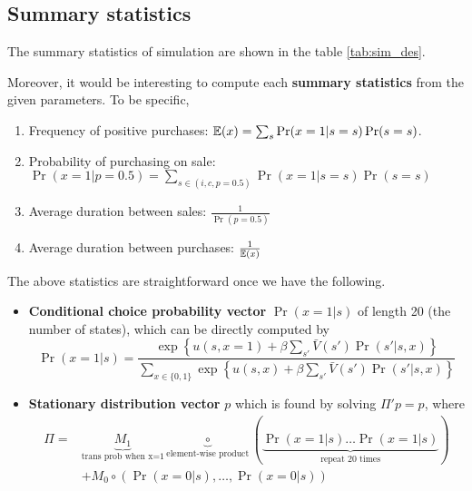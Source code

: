 \documentclass[12pt]{article}[margin=1in]
\begin{document}
\subsection{Summary statistics}
The summary statistics of simulation are shown in the table \ref{tab:sim_des}.
\begin{table}[h]
    \centering
    \begin{minipage}{0.45\textwidth}
        \fontsize{8pt}{10pt}\selectfont
        \centering
        
        \label{tab:sim_des}
    \end{minipage}%
    \hspace{0.05\textwidth} %
    \begin{minipage}{0.45\textwidth}\fontsize{8pt}{10pt}\selectfont
        \centering
        
        \label{tab:theo_des}
    \end{minipage}
\end{table}
Moreover, it would be interesting to compute each \textbf{summary statistics}
from the given parameters. To be specific,
\begin{enumerate}
    \item Frequency of positive purchases: $\mathbb{E}(x)=\sum_s\Pr(x=1|s=s)\Pr(s=s)$.
    \item Probability of purchasing on sale: $\Pr(x=1|p=0.5)=\sum_{s\in (i,c,p=0.5)}
              \Pr(x=1|s=s)\Pr(s=s)$
    \item Average duration between sales: $\frac{1}{\Pr(p=0.5)}$
    \item Average duration between purchases: $\frac{1}{\mathbb{E}(x)}$
\end{enumerate}
The above statistics are straightforward once we have the following.
\begin{itemize}
    \item \textbf{Conditional choice probability vector} $\Pr(x=1|s)$ of length 20 (the number of states),
          which can be directly computed by
          \begin{equation*}
              \Pr(x=1|s)=\frac{\exp\left\{ u(s,x=1) + \beta \sum_{s'}\bar{V}(s') \Pr(s'|s,x)\right\}}{\sum_{x \in \{0,1\}} \exp\left\{ u(s,x) + \beta \sum_{s'}\bar{V}(s') \Pr(s'|s,x)\right\}}
          \end{equation*}
    \item \textbf{Stationary distribution vector} $p$ which is found by solving $\Pi' p = p$, where
          \begin{equation*}
              \begin{split}
                  \Pi = & \underbrace{M_1}_{\text{trans prob when x=1}} \underbrace{\circ}_{\text{element-wise product}} (\underbrace{\Pr(x=1|s) \ldots \Pr(x=1|s)}_{\text{repeat 20 times}}) \\
                        & + M_0 \circ (\Pr(x=0|s),\ldots,\Pr(x=0|s))
              \end{split}
          \end{equation*}
\end{itemize}
\end{document}
